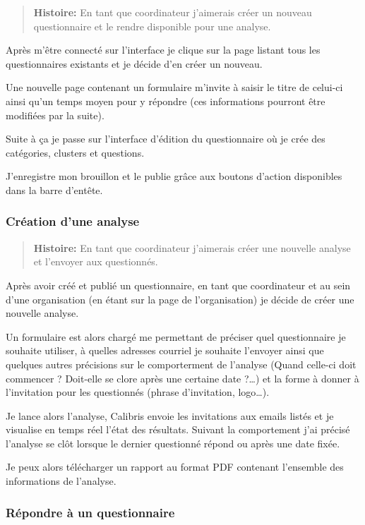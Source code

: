 \documentclass[12pt,a4paper]{book}
\begin{document}
\begin{quote}
  \textbf{Histoire:} En tant que coordinateur j'aimerais créer un nouveau questionnaire et le rendre disponible pour une analyse.
\end{quote}

Après m'être connecté sur l'interface je clique sur la page listant tous les questionnaires existants et je décide d'en créer un nouveau.

Une nouvelle page contenant un formulaire m'invite à saisir le titre de celui-ci ainsi qu'un temps moyen pour y répondre (ces informations pourront être modifiées par la suite).

Suite à ça je passe sur l'interface d'édition du questionnaire où je crée des catégories, clusters et questions. 

J'enregistre mon brouillon et le publie grâce aux boutons d'action disponibles dans la barre d'entête.

\subsubsection{Création d'une analyse}

\begin{quote}
  \textbf{Histoire:} En tant que coordinateur j'aimerais créer une nouvelle analyse et l'envoyer aux questionnés.
\end{quote}

Après avoir créé et publié un questionnaire, en tant que coordinateur et au sein d'une organisation (en étant sur la page de l'organisation) je décide de créer une nouvelle analyse.

Un formulaire est alors chargé me permettant de préciser quel questionnaire je souhaite utiliser, à quelles adresses courriel je souhaite l'envoyer ainsi que quelques autres précisions sur le comporterment de l'analyse (Quand celle-ci doit commencer ? Doit-elle se clore après une certaine date ?…) et la forme à donner à l'invitation pour les questionnés (phrase d'invitation, logo…).

Je lance alors l'analyse, Calibris envoie les invitations aux emails listés et je visualise en temps réel l'état des résultats. Suivant la comportement j'ai précisé l'analyse se clôt lorsque le dernier questionné répond ou après une date fixée.

Je peux alors télécharger un rapport au format PDF contenant l'ensemble des informations de l'analyse.

\subsubsection{Répondre à un questionnaire}
\end{document}
